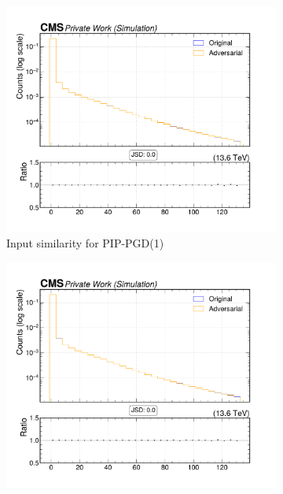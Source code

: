 \begin{figure}[htbp]
  \centering
  \begin{subfigure}[t]{0.32\textwidth}
    \includegraphics[width=\linewidth]{media/output/features/compare/combined_it_1/cmp_cpf_arr_Cpfcan_BtagPf_trackSip2dSig.pdf}
    \caption*{Input similarity for PIP-PGD(1)}
  \end{subfigure}\hfill
  \begin{subfigure}[t]{0.32\textwidth}
    \includegraphics[width=\linewidth]{media/output/features/compare/combined_it_2/cmp_cpf_arr_Cpfcan_BtagPf_trackSip2dSig.pdf}

\end{subfigure}
\end{figure}
